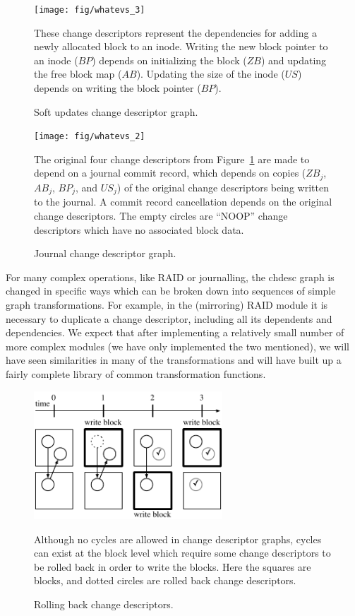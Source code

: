 \begin{figure}
  \centering
  \texttt{[image: fig/whatevs\_3]}
  \caption{\label{fig:softupdates} Soft updates change descriptor graph.}{These
  change descriptors represent the dependencies for adding a newly allocated
  block to an inode. Writing the new block pointer to an inode ($BP$) depends
  on initializing the block ($ZB$) and updating the free block map ($AB$).
  Updating the size of the inode ($US$) depends on writing the block pointer
  ($BP$).
}
\end{figure}

\begin{figure}
  \centering
  \texttt{[image: fig/whatevs\_2]}
  \caption{\label{fig:journal} Journal change descriptor graph.}{The original
  four change descriptors from Figure~\ref{fig:softupdates} are made to depend
  on a journal commit record, which depends on copies ($ZB_j$, $AB_j$, $BP_j$,
  and $US_j$) of the original change descriptors being written to the journal. A
  commit record cancellation depends on the original change descriptors. The
  empty circles are ``NOOP'' change descriptors which have no associated block
  data.
}
\end{figure}

For many complex operations, like RAID or journalling, the chdesc graph is
changed in specific ways which can be broken down into sequences of simple graph
transformations. For example, in the (mirroring) RAID module it is necessary to
duplicate a change descriptor, including all its dependents and dependencies. We
expect that after implementing a relatively small number of more complex modules
(we have only implemented the two mentioned), we will have seen similarities in
many of the transformations and will have built up a fairly complete library of
common transformation functions.

\begin{figure}
  \centering
  \includegraphics[width=200pt]{rollback_sequence}
  \caption{\label{fig:rollback} Rolling back change descriptors.}{Although no
  cycles are allowed in change descriptor graphs, cycles can exist at the block
  level which require some change descriptors to be rolled back in order to
  write the blocks. Here the squares are blocks, and dotted circles are rolled
  back change descriptors.
}
\end{figure}
